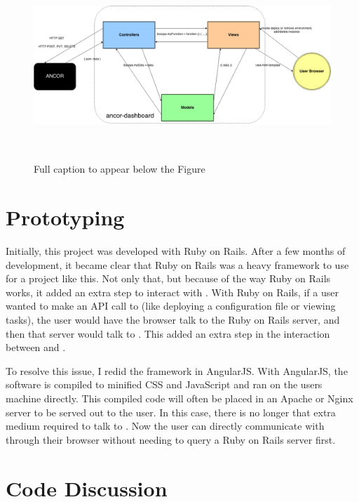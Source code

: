\begin{figure}[htb]%

    \includegraphics[height=2.8in]{figures/ad.png}

    \caption[\projectName{} Full Architecture
    ]{Full caption to appear below the Figure}

    \label{fullArchitecture}
\end{figure}

\section{Prototyping}
\label{makereference3.2}

Initially, this project was developed with Ruby on Rails. After a few months of development, it became clear that Ruby on Rails was a heavy framework to use for a project like this. Not only that, but because of the way Ruby on Rails works, it added an extra step to interact with \ancor{}. With Ruby on Rails, if a user wanted to make an API call to \ancor{} (like deploying a configuration file or viewing tasks), the user would have the browser talk to the Ruby on Rails server, and then that server would talk to \ancor{}. This added an extra step in the interaction between \projectName{} and \ancor.

To resolve this issue, I redid the framework in AngularJS. With AngularJS, the software is compiled to minified CSS and JavaScript and ran on the users machine directly. This compiled code will often be placed in an Apache or Nginx server to be served out to the user. In this case, there is no longer that extra medium required to talk to \ancor. Now the user can directly communicate with \ancor{} through their browser without needing to query a Ruby on Rails server first.

\section{\projectName{} Code Discussion}
\label{makereference3.3}

